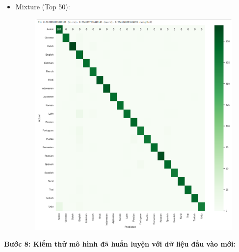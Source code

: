 \begin{itemize}
\begin{itemize}
\begin{figure}[H]
\end{figure}
\clearpage
        \item Mixture (Top 50):
        \begin{figure}[H]
    \centering
    \includegraphics[width=1\textwidth]{img/docspics/Picture18.png}
\end{figure}
    \end{itemize}
\end{itemize}

\textbf{Bước 8: Kiểm thử mô hình đã huấn luyện với dữ liệu đầu vào mới:}

